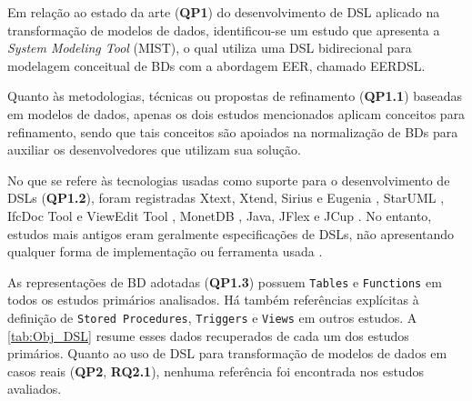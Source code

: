 Em relação ao estado da arte (\textbf{QP1}) do desenvolvimento de \ac{DSL} aplicado na transformação de modelos de dados, identificou-se um estudo que apresenta a \textit{System Modeling Tool} (MIST), o qual utiliza uma \ac{DSL} bidirecional para modelagem conceitual de \acp{BD} com a abordagem \ac{EER}, chamado EERDSL. 

Quanto às metodologias, técnicas ou propostas de refinamento (\textbf{QP1.1}) baseadas em modelos de dados, apenas os dois estudos mencionados aplicam conceitos para refinamento, sendo que tais conceitos são apoiados na normalização de \acp{BD} para auxiliar os desenvolvedores que utilizam sua solução.

No que se refere às tecnologias usadas como suporte para o desenvolvimento de \acp{DSL} (\textbf{QP1.2}), foram registradas Xtext, Xtend, Sirius e Eugenia \cite{Celikovic:2014, Dimitrieski:2015}, StarUML \cite{Ayadi:2016}, IfcDoc Tool e ViewEdit Tool \cite{Mazairac:2013}, MonetDB \cite {Kersten:2011}, Java, JFlex e JCup \cite{Tian:2006}. 
No entanto, estudos mais antigos eram geralmente especificações de \acp{DSL}, não apresentando qualquer forma de implementação ou ferramenta usada \cite{Shipman:1981, Jagannathan:1988, Litwin:1989}.

As representações de \ac{BD} adotadas (\textbf{QP1.3}) possuem \texttt{Tables} e \texttt{Functions} em todos os estudos primários analisados.
Há também referências explícitas à definição de \texttt{Stored Procedures}, \texttt{Triggers} e \texttt{Views} em outros estudos. 
A \autoref{tab:Obj_DSL} resume esses dados recuperados de cada um dos estudos primários. 
Quanto ao uso de \ac{DSL} para transformação de modelos de dados em casos reais (\textbf{QP2}, \textbf{RQ2.1}), nenhuma referência foi encontrada nos estudos avaliados.

